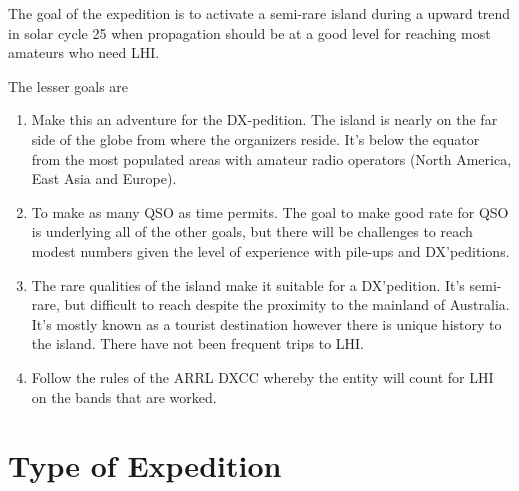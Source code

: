 \documentclass[11pt]{article}
\begin{document}
The goal of the expedition is to activate a semi-rare island
during a upward trend in solar cycle 25 when propagation should be
at a good level for reaching most amateurs who need LHI.
\par
The lesser goals are
\begin{enumerate}
\item Make this an adventure for the DX-pedition.  The island is
nearly on the far side of the globe from where the organizers reside.
It's below the equator from the most populated areas with amateur
radio operators (North America, East Asia and Europe).
\item To make as many QSO as time permits.  The
goal to make good rate for QSO is underlying all of the
other goals, but there will be challenges to reach
modest numbers given the level of experience with 
pile-ups and DX'peditions.
\item The rare qualities of the island make it suitable
for a DX'pedition.  It's semi-rare, but difficult to
reach despite the proximity to the mainland of
Australia.  It's mostly known as a tourist destination
however there is unique history to the island.  There
have not been frequent trips to LHI.
\item Follow the rules of the ARRL DXCC whereby
the entity will count for LHI on
the bands that are worked.
\end{enumerate}

\section{Type of Expedition}
\end{document}

